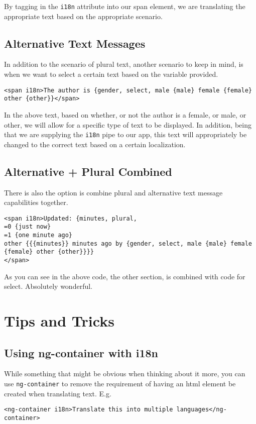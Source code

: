 By tagging in the \lstinline{i18n} attribute into our span element, we are 
translating the appropriate text based on the appropriate scenario. 

\subsection{Alternative Text Messages}
In addition to the scenario of plural text, another scenario to keep in mind, 
is when we want to select a certain text based on the variable provided. 

\begin{lstlisting}
<span i18n>The author is {gender, select, male {male} female {female} other {other}}</span>  
\end{lstlisting}

In the above text, based on whether, or not the author is a female, or male, or 
other, we will allow for a specific type of text to be displayed. In addition,
being that we are supplying the \lstinline{i18n} pipe to our app, this text 
will appropriately be changed to the correct text based on a certain localization.

\subsection{Alternative + Plural Combined}
There is also the option is combine plural and alternative text message capabilities 
together. 
\begin{lstlisting}
<span i18n>Updated: {minutes, plural,
=0 {just now}
=1 {one minute ago}
other {{{minutes}} minutes ago by {gender, select, male {male} female {female} other {other}}}}
</span>
\end{lstlisting}

As you can see in the above code, the other section, is combined with code for
select. Absolutely wonderful. 

\section{Tips and Tricks}

\subsection{Using ng-container with i18n}
While something that might be obvious when thinking about it more, you can use 
\lstinline{ng-container} to remove the requirement of having an html element 
be created when translating text. E.g. 
\begin{lstlisting}
<ng-container i18n>Translate this into multiple languages</ng-container>
\end{lstlisting}

